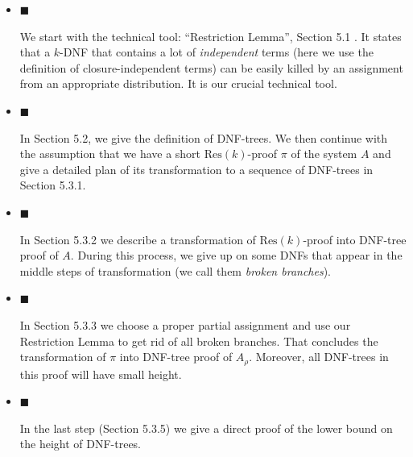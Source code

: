 \documentclass[10pt,a4paper]{article}
\begin{document}
\begin{itemize}


\item[] 
$\blacksquare$ 


We start with the technical tool: “Restriction Lemma”, Section 5.1 .
It states that a
$k$-DNF that contains a lot of \emph{independent} terms (here we use the definition of
closure-independent terms) can be easily killed by an assignment from an appropriate distribution. It
is our crucial technical tool.\par





\item[] 
$\blacksquare$ 


In Section 5.2, we give the definition of
DNF-trees. We then continue with the assumption that we have a short $\mathrm{Res}(k)$-proof $\pi$ of the
system $A$ and give a detailed plan of its transformation to a sequence of DNF-trees in
Section 5.3.1.\par





\item[] 
$\blacksquare$ 


In Section 5.3.2 we describe a transformation of $\mathrm{Res}(k)$-proof into DNF-tree proof of
$A$. During this process, we give up on some DNFs that appear in the middle steps of
transformation (we call them \emph{broken branches}).\par





\item[] 
$\blacksquare$ 


In Section 5.3.3 we choose a proper partial assignment and use our
Restriction Lemma to get
rid of all broken branches. That concludes the transformation of $\pi$ into DNF-tree proof of
$A_{\rho}$. Moreover, all DNF-trees in this proof will have small height.\par





\item[] 
$\blacksquare$ 


In the last step (Section 5.3.5) we give a direct proof of the lower bound
on the height of DNF-trees.\par





\end{itemize}
\end{document}
